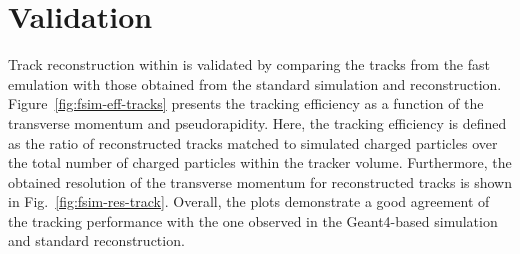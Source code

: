 \section{Validation}
\label{sec:fsim-validation}

Track reconstruction within \FSIM is validated by comparing the tracks from the fast emulation with those obtained from the standard simulation and reconstruction. Figure~\ref{fig:fsim-eff-tracks} presents the tracking efficiency as a function of the transverse momentum and pseudorapidity. Here, the tracking efficiency is defined as the ratio of reconstructed tracks matched to simulated charged particles over the total number of charged particles within the tracker volume. Furthermore, the obtained resolution of the transverse momentum for reconstructed tracks is shown in Fig.~\ref{fig:fsim-res-track}. Overall, the plots demonstrate a good agreement of the \FSIM tracking performance with the one observed in the Geant4-based simulation and standard reconstruction.


